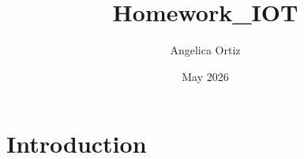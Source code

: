 \documentclass{article}
\title{Homework_IOT}
\author{Angelica Ortiz}
\date{May 2026}
\begin{document}
\maketitle

\section{Introduction}
\end{document}
